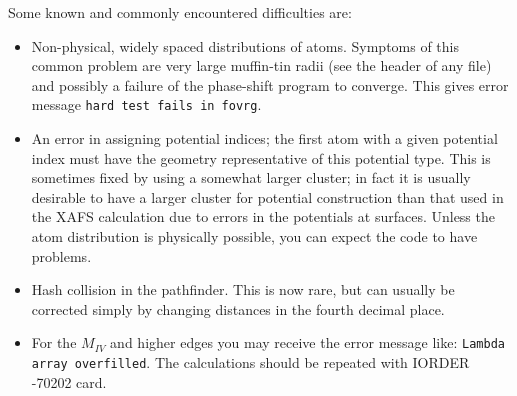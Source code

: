 \documentclass[11pt,oneside]{report} %
\begin{document}
{Some known and commonly encountered difficulties are:
\begin{itemize}
\item Non-physical, widely spaced distributions of atoms. Symptoms of
  this common problem are very large muffin-tin radii (see the header
  of any  file) and possibly a failure of the phase-shift
  program to converge.  This gives error message \texttt{hard test
    fails in fovrg}.
\item An error in assigning potential indices; the first atom with a
  given potential index must have the geometry representative of this
  potential type. This is sometimes fixed by using a somewhat larger
  cluster; in fact it is usually desirable to have a larger cluster
  for potential construction than that used in the XAFS calculation
  due to errors in the potentials at surfaces.  Unless the atom
  distribution is physically possible, you can expect the code to have
  problems.
\item Hash collision in the pathfinder. This is now rare, but can
  usually be corrected simply by changing distances in the fourth
  decimal place.
\item For the $M_{\mathit{IV}}$ and higher edges you may receive the
  error message like: \texttt{Lambda array overfilled}. The
  calculations should be repeated with IORDER -70202 card.
\end{itemize}


}
\end{document}
